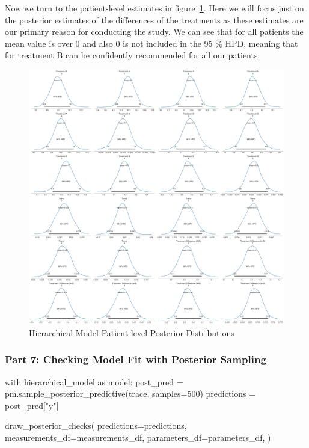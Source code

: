 \documentclass[12pt,a4paper,leqno]{report}
\theoremstyle{plain}
\theoremstyle{definition}
\theoremstyle{remark}
\begin{document}
Now we turn to the patient-level estimates in figure\
\ref{hierarchicalmodelpatientposteriors}. Here we will focus just on the
posterior estimates of the differences of the treatments as these estimates are our
primary reason for conducting the study. We can see that for all patients
the mean value is over 0 and also 0 is not included in the 95 \% HPD, meaning that for
treatment B can be confidently recommended for all our patients.

\bigskip
\begin{figure}[H]
    \caption{Hierarchical Model Patient-level Posterior Distributions}\label{hierarchicalmodelpatientposteriors}
    \bigskip
    \includegraphics[width=\textwidth,height=\textheight,keepaspectratio]{hierarchical_model_patient_level_posteriors.pdf}
\end{figure}
\bigskip

\subsubsection*{Part 7: Checking Model Fit with Posterior Sampling}

\bigskip
\begin{pyverbatim}[][fontsize=\footnotesize]
with hierarchical_model as model:
    post_pred = pm.sample_posterior_predictive(trace, samples=500)
    predictions = post_pred["y"]

draw_posterior_checks(
    predictions=predictions,
    measurements_df=measurements_df,
    parameters_df=parameters_df,
)
\end{pyverbatim}
\smallskip
\end{document}
